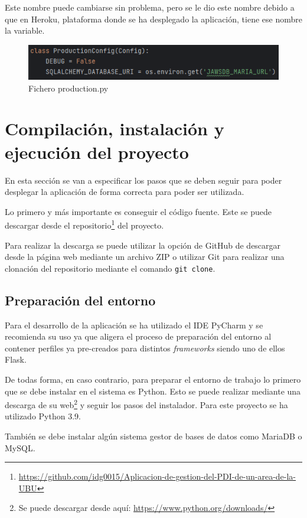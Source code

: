 Este nombre puede cambiarse sin problema, pero se le dio este nombre debido a que en Heroku, plataforma donde se ha desplegado la aplicación, tiene ese nombre la variable.

\begin{figure}
	\centering
	\includegraphics[width=\textwidth]{../img/Anexos/ManualProgramador/production.png}
	\caption{Fichero production.py}\label{fig:ficheroProd}
\end{figure}


\section{Compilación, instalación y ejecución del proyecto}
En esta sección se van a especificar los pasos que se deben seguir para poder desplegar la aplicación de forma correcta para poder ser utilizada.

Lo primero y más importante es conseguir el código fuente. 
Este se puede descargar desde el repositorio\footnote{\url{https://github.com/idg0015/Aplicacion-de-gestion-del-PDI-de-un-area-de-la-UBU}} del proyecto.

Para realizar la descarga se puede utilizar la opción de GitHub de descargar desde la página web mediante un archivo ZIP o utilizar Git para realizar una clonación del repositorio mediante el comando \texttt{git clone}.

\subsection{Preparación del entorno}
Para el desarrollo de la aplicación se ha utilizado el IDE PyCharm y se recomienda su uso ya que aligera el proceso de preparación del entorno al contener perfiles ya pre-creados para distintos \textit{frameworks} siendo uno de ellos Flask.

De todas forma, en caso contrario, para preparar el entorno de trabajo lo primero que se debe instalar en el sistema es Python.
Esto se puede realizar mediante una descarga de su web\footnote{Se puede descargar desde aquí: \url{https://www.python.org/downloads/}} y seguir los pasos del instalador. Para este proyecto se ha utilizado Python 3.9.

También se debe instalar algún sistema gestor de bases de datos como MariaDB o MySQL.

